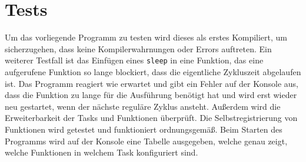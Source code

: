 \chapter{Tests}
\label{cha:tests}

Um das vorliegende Programm zu testen wird dieses als erstes Kompiliert, um sicherzugehen, dass keine Kompilerwahrnungen oder Errors auftreten. 
Ein weiterer Testfall ist das Einfügen eines \texttt{sleep} in eine Funktion, das eine aufgerufene Funktion so lange blockiert, dass die eigentliche Zykluszeit abgelaufen ist. Das Programm reagiert wie erwartet und gibt ein Fehler auf der Konsole aus, dass die Funktion zu lange für die Ausführung benötigt hat und wird erst wieder neu gestartet, wenn der nächste reguläre Zyklus ansteht. 
Außerdem wird die Erweiterbarkeit der Tasks und Funktionen überprüft. 
Die Selbstregistrierung von Funktionen wird getestet und funktioniert ordnungsgemäß. Beim Starten des Programms wird auf der Konsole eine Tabelle ausgegeben, welche genau zeigt, welche Funktionen in welchem Task konfiguriert sind.  